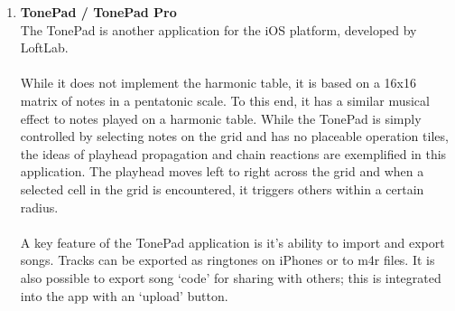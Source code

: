 \documentclass[10pt,a4paper]{article}
\begin{document}
\begin{enumerate}
\item \textbf{TonePad / TonePad Pro}\\
The TonePad is another application for the iOS platform, developed by LoftLab.\cite{tonepaditunes} \\
\\
While it does not implement the harmonic table, it is based on a 16x16 matrix of notes in a pentatonic scale. To this end, it has a similar musical effect to notes played on a harmonic table. While the TonePad is simply controlled by selecting notes on the grid and has no placeable operation tiles, the ideas of playhead propagation and chain reactions are exemplified in this application. The playhead moves left to right across the grid and when a selected cell in the grid is encountered, it triggers others within a certain radius. \\
\\
A key feature of the TonePad application is it’s ability to import and export songs. Tracks can be exported as ringtones on iPhones or to m4r files. It is also possible to export song ‘code’ for sharing with others; this is integrated into the app with an ‘upload’ button. 
\end{enumerate}
\end{document}
